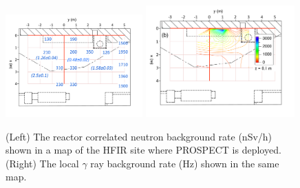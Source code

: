 \begin{figure}
    \centering
    \includegraphics[width=0.47\textwidth, valign=t]{Figures/NeutronBGMap.pdf}
    \includegraphics[width=0.51\textwidth, valign=t]{Figures/GammaBGMap.pdf}
    \caption[Local background distribution at the HFIR facility]{(Left) The reactor correlated neutron background rate (nSv/h) shown in a map of the HFIR site where PROSPECT is deployed.
    (Right) The local $\gamma$ ray background rate (Hz) shown in the same map.
    }
    \label{fig:prospect_background}
\end{figure}



